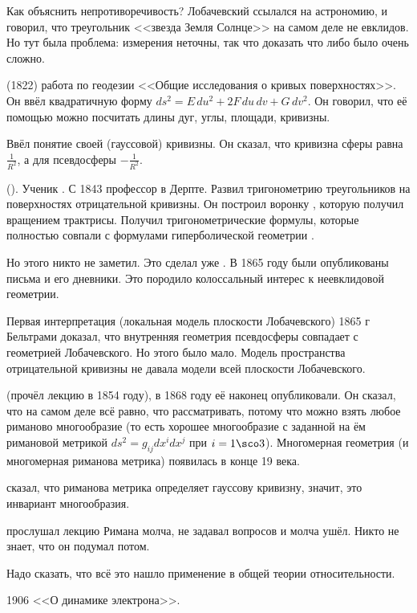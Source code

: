 \documentclass[a4paper,oneside,fleqn,10pt]{article}
\begin{document}
Как объяснить непротиворечивость? Лобачевский ссылался на астрономию,
и говорил, что треугольник <<звезда Земля Солнце>> на самом деле не
евклидов. Но тут была проблема: измерения неточны, так что доказать
что либо было очень сложно.

 (1822) работа по геодезии <<Общие исследования о кривых
поверхностях>>.  Он ввёл квадратичную форму $ds^2 = E\,du^2 +
2F\,du\,dv + G\, dv^2$.  Он говорил, что её помощью можно посчитать
длины дуг, углы, площади, кривизны.

Ввёл понятие своей (гауссовой) кривизны. Он сказал, что кривизна сферы
равна $\frac{1}{R^2}$, а для псевдосферы $-\frac{1}{R^2}$.

 (). Ученик .  С
1843 профессор в Дерпте. Развил тригонометрию треугольников на
поверхностях отрицательной кривизны. Он построил воронку
, которую получил вращением трактрисы.  Получил
тригонометрические формулы, которые полностью совпали с формулами
гиперболической геометрии .

Но этого никто не заметил. Это сделал уже .  В 1865
году были опубликованы письма  и его дневники.
Это породило колоссальный интерес к неевклидовой геометрии.

Первая интерпретация (локальная модель плоскости Лобачевского) 1865 г
Бельтрами доказал, что внутренняя геометрия псевдосферы совпадает с
геометрией Лобачевского.  Но этого было мало. Модель пространства
отрицательной кривизны не давала модели всей плоскости Лобачевского.

 (прочёл лекцию в 1854 году), в 1868 году её наконец
опубликовали.  Он сказал, что на самом деле всё равно, что
рассматривать, потому что можно взять любое риманово многообразие (то
есть хорошее многообразие с заданной на ём римановой метрикой $ds^2 =
g_{ij}dx^idx^j$ при $i = 1\sco 3$).  Многомерная геометрия (и
многомерная риманова метрика) появилась в конце 19 века.

 сказал, что риманова метрика определяет гауссову
кривизну, значит, это инвариант многообразия.

 прослушал лекцию Римана молча, не задавал вопросов и
молча ушёл.  Никто не знает, что он подумал потом.

Надо сказать, что всё это нашло применение в общей теории
относительности.

1906  <<О динамике электрона>>.
\end{document}

